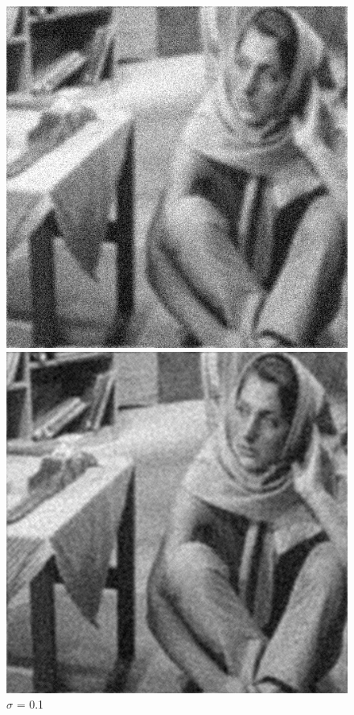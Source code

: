 \documentclass{article}
\begin{document}
    \begin{figure}[!htb]
      \includegraphics[scale=.28]{./deblurring/0_1/final.png}
      \caption{\(\sigma\) = 0.1}
    \endminipage\hfill
      \includegraphics[scale=.28]{./deblurring/0_1/recover.png}

\end{figure}
\end{document}

